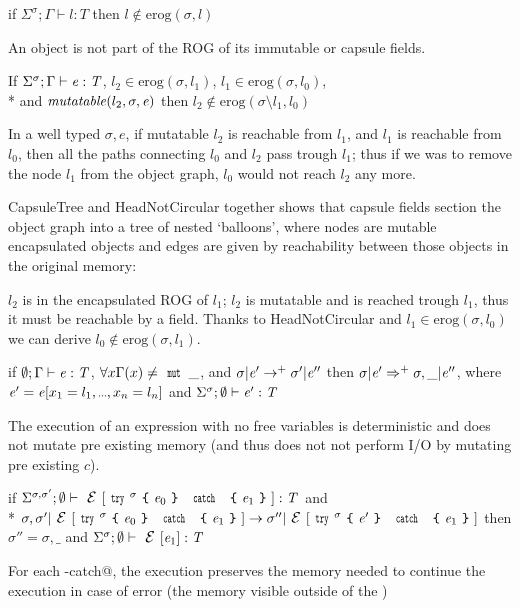 \begin{Assumption}[HeadNotCircular]
if
$\Sigma^\sigma;\Gamma\vdash l:T$
then $l\notin\text{erog}(\sigma,l)$
\end{Assumption}
\noindent
\noindent An object is not part of the ROG of its immutable or capsule fields.


\begin{Assumption}[CapsuleTree]
If   $\Sigma^\sigma;\Gamma\vdash \e:\T$,
$l_2\in\text{erog}(\sigma,l_1)$,
$l_1\in\text{erog}(\sigma,l_0)$,\\*
and
$\mathit{mutatable}(l_2,\sigma,\e)$
then 
$l_2\notin\text{erog}(\sigma\setminus l_1,l_0)$
\end{Assumption}
\noindent In a well typed $\sigma,e$, if mutatable $l_2$ is reachable from
$l_1$, and $l_1$ is reachable from $l_0$,
then all the paths connecting $l_0$ and $l_2$ pass trough $l_1$; thus
if we was to remove the node $l_1$ from the object graph, $l_0$ would not reach $l_2$ any more.


CapsuleTree and HeadNotCircular together 
shows that capsule fields section the object graph into a tree of nested `balloons',
where nodes are mutable encapsulated objects and
edges are given by reachability between those objects in the original memory:

$l_2$ is in the encapsulated ROG of $l_1$;
$l_2$ is mutatable and is reached trough $l_1$, thus
it must be reachable by a \Q@capsule@ field.
Thanks to HeadNotCircular and $l_1\in\text{erog}(\sigma,l_0)$ we can derive 
$l_0\notin\text{erog}(\sigma,l_1)$.



\begin{Assumption}[Determinism]
if $\emptyset;\Gamma\vdash \e:\T$, 
$\forall x \Gamma(x)\neq\Kw{mut}\,\_$, and
$\sigma | \e'\rightarrow^+ \sigma' | \e''$
then 
$\sigma | \e'\Rightarrow^+ \sigma,\_ | \e''$,
where $\e'=\e[x_1=l_1,\ldots,x_n=l_n]$ and $\Sigma^\sigma;\emptyset\vdash \e':\T$
\end{Assumption}
\noindent The execution of an expression
with no \Q@mut@ free variables is deterministic and does not
  mutate pre existing memory (and thus does not not perform I/O by mutating pre existing $c$).


\begin{Assumption}[StrongExceptionSafety]
if $\Sigma^{\sigma,\sigma'};\emptyset\vdash \ctx[\Kw{try}^\sigma\oC\e_0\cC\ \Kw{catch}\ \oC\e_1\cC]:\T$
and\\*
$
\sigma,\sigma'|\ctx[\Kw{try}^\sigma\oC\e_0\cC\ \Kw{catch}\ \oC\e_1\cC]\rightarrow 
\sigma''|\ctx[\Kw{try}^\sigma\oC\e'\cC\ \Kw{catch}\ \oC\e_1\cC]
$
then 
$\sigma''=\sigma,\_$
and
$\Sigma^\sigma;\emptyset\vdash \ctx[\e_1]:\T$
\end{Assumption}
\noindent
For each \Q@try-catch@, the execution preserves the memory needed to continue the execution in case of error
(the memory visible outside of the \Q@try@)%


